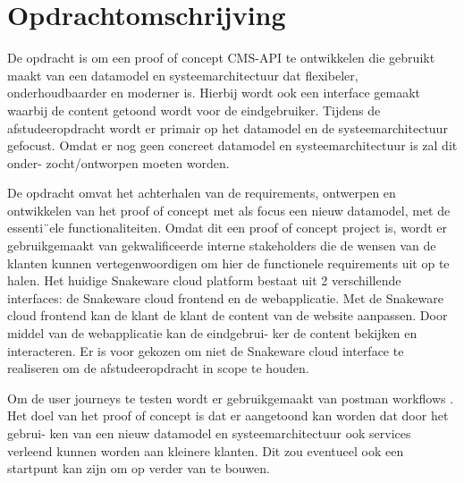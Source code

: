 \section{Opdrachtomschrijving}
De opdracht is om een proof of concept CMS-API te ontwikkelen die gebruikt maakt van een
datamodel en systeemarchitectuur dat flexibeler, onderhoudbaarder en moderner is. Hierbij
wordt ook een interface gemaakt waarbij de content getoond wordt voor de eindgebruiker.
Tijdens de afstudeeropdracht wordt er primair op het datamodel en de systeemarchitectuur
gefocust. Omdat er nog geen concreet datamodel en systeemarchitectuur is zal dit onder-
zocht/ontworpen moeten worden.

\whitespace
De opdracht omvat het achterhalen van de requirements, ontwerpen en ontwikkelen van
het proof of concept met als focus een nieuw datamodel, met de essenti¨ele functionaliteiten.
Omdat dit een proof of concept project is, wordt er gebruikgemaakt van gekwalificeerde
interne stakeholders die de wensen van de klanten kunnen vertegenwoordigen om hier de
functionele requirements uit op te halen.
Het huidige Snakeware cloud platform bestaat uit 2 verschillende interfaces: de Snakeware
cloud frontend en de webapplicatie. Met de Snakeware cloud frontend kan de klant de klant
de content van de website aanpassen. Door middel van de webapplicatie kan de eindgebrui-
ker de content bekijken en interacteren. Er is voor gekozen om niet de Snakeware cloud
interface te realiseren om de afstudeeropdracht in scope te houden.

\whitespace
Om de user journeys te testen wordt er gebruikgemaakt van postman workflows \Parencite{PostmanWorkflows} .
Het doel van het proof of concept is dat er aangetoond kan worden dat door het gebrui-
ken van een nieuw datamodel en systeemarchitectuur ook services verleend kunnen worden
aan kleinere klanten. Dit zou eventueel ook een startpunt kan zijn om op verder van te
bouwen.


